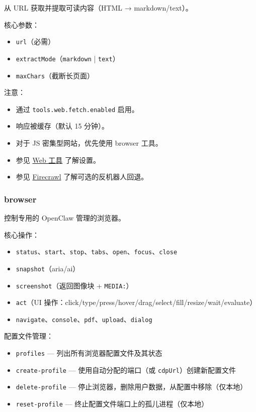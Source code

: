 从 URL 获取并提取可读内容（HTML → markdown/text）。

核心参数：

\begin{itemize}
  \item \texttt{url}（必需）
  \item \texttt{extractMode}（\texttt{markdown} | \texttt{text}）
  \item \texttt{maxChars}（截断长页面）
\end{itemize}


注意：

\begin{itemize}
  \item 通过 \texttt{tools.web.fetch.enabled} 启用。
  \item 响应被缓存（默认 15 分钟）。
  \item 对于 JS 密集型网站，优先使用 browser 工具。
  \item 参见 \href{/tools/web}{Web 工具} 了解设置。
  \item 参见 \href{/tools/firecrawl}{Firecrawl} 了解可选的反机器人回退。
\end{itemize}


\subsubsection{browser}


控制专用的 OpenClaw 管理的浏览器。

核心操作：

\begin{itemize}
  \item \texttt{status}、\texttt{start}、\texttt{stop}、\texttt{tabs}、\texttt{open}、\texttt{focus}、\texttt{close}
  \item \texttt{snapshot}（aria/ai）
  \item \texttt{screenshot}（返回图像块 + \texttt{MEDIA:}）
  \item \texttt{act}（UI 操作：click/type/press/hover/drag/select/fill/resize/wait/evaluate）
  \item \texttt{navigate}、\texttt{console}、\texttt{pdf}、\texttt{upload}、\texttt{dialog}
\end{itemize}


配置文件管理：

\begin{itemize}
  \item \texttt{profiles} — 列出所有浏览器配置文件及其状态
  \item \texttt{create-profile} — 使用自动分配的端口（或 \texttt{cdpUrl}）创建新配置文件
  \item \texttt{delete-profile} — 停止浏览器，删除用户数据，从配置中移除（仅本地）
  \item \texttt{reset-profile} — 终止配置文件端口上的孤儿进程（仅本地）
\end{itemize}


